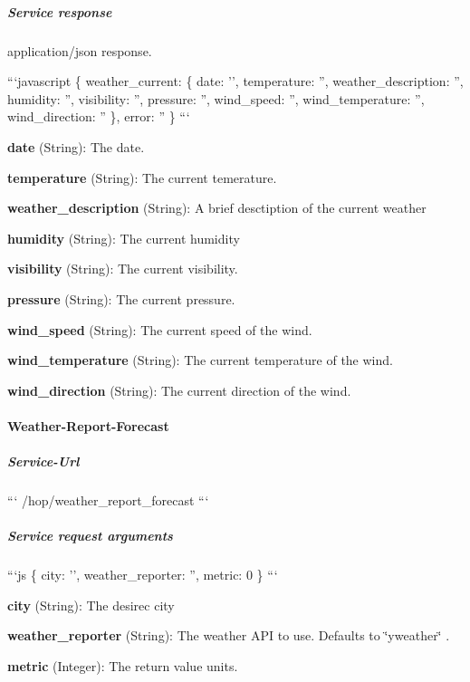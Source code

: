 \subparagraph*{Service response}

application/json response.

```javascript \{ weather\-\_\-current\-: \{ date\-: '', temperature\-: '', weather\-\_\-description\-: '', humidity\-: '', visibility\-: '', pressure\-: '', wind\-\_\-speed\-: '', wind\-\_\-temperature\-: '', wind\-\_\-direction\-: '' \}, error\-: '' \} ```


\begin{DoxyItemize}
\item {\bfseries date} (String)\-: The date.
\item {\bfseries temperature} (String)\-: The current temerature.
\item {\bfseries weather\-\_\-description} (String)\-: A brief desctiption of the current weather
\item {\bfseries humidity} (String)\-: The current humidity
\item {\bfseries visibility} (String)\-: The current visibility.
\item {\bfseries pressure} (String)\-: The current pressure.
\item {\bfseries wind\-\_\-speed} (String)\-: The current speed of the wind.
\item {\bfseries wind\-\_\-temperature} (String)\-: The current temperature of the wind.
\item {\bfseries wind\-\_\-direction} (String)\-: The current direction of the wind.
\end{DoxyItemize}

\paragraph*{Weather-\/\-Report-\/\-Forecast}

\subparagraph*{Service-\/\-Url}

``` /hop/weather\-\_\-report\-\_\-forecast ```

\subparagraph*{Service request arguments}

```js \{ city\-: '', weather\-\_\-reporter\-: '', metric\-: 0 \} ```


\begin{DoxyItemize}
\item {\bfseries city} (String)\-: The desirec city
\item {\bfseries weather\-\_\-reporter} (String)\-: The weather A\-P\-I to use. Defaults to \char`\"{}yweather\char`\"{} .
\item {\bfseries metric} (Integer)\-: The return value units.
\end{DoxyItemize}


